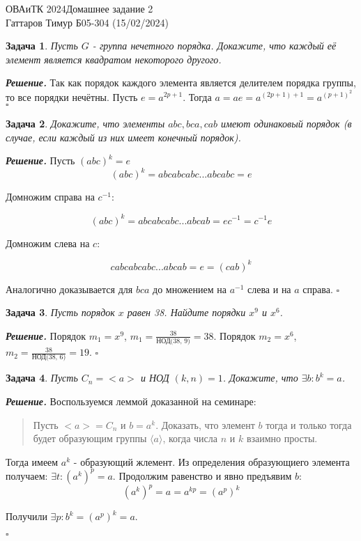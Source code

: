\documentclass[12pt]{article}
\newtheorem{problem}{Задача}
\newenvironment{solution}[1][\it{Решение}]{\textbf{#1. } }{$\square$}
\begin{document}
\noindent ОВАиТК 2024\hfill Домашнее задание 2 \\
Гаттаров Тимур Б05-304 (15/02/2024)

\hrulefill


\begin{problem}
Пусть $G$ - группа нечетного порядка. Докажите, что каждый её элемент является квадратом некоторого другого.
\end{problem}

\begin{solution}
Так как порядок каждого элемента является делителем порядка группы, то все порядки нечётны. Пусть $e = a^{2p + 1}$. Тогда $a = ae = a^{(2p + 1) + 1} = a^{(p + 1)^2}$
\end{solution} 


\begin{problem}
Докажите, что элементы $a b c, b c a, c a b$ имеют одинаковый порядок (в случае, если каждый из них имеет конечный порядок).
\end{problem}

\begin{solution}
Пусть $(abc)^k = e$
$$
(abc)^k = abcabcabc...abcabc = e
$$


Домножим справа на $c^{-1}$:


$$
(abc)^k = abcabcabc...abcab = ec^{-1} = c^{-1}e
$$



Домножим слева на $c$:

$$
cabcabcabc...abcab = e = (cab)^k
$$

Аналогично доказывается для $bca$ до множением на $a^{-1}$ слева и на $a$ справа.
\end{solution}


\begin{problem}
 Пусть порядок $x$ равен 38. Найдите порядки $x^9$ и $x^6$.
\end{problem}

 \begin{solution} Порядок $m_1 = x^9$, $m_1 = \frac{38}{\text{НОД(38, 9)}} = 38$. Порядок $m_2 = x^6$, $m_2 = \frac{38}{\text{НОД(38, 6)}} = 19$.
 \end{solution}


\begin{problem}
    Пусть $C_n=<a>$ и НОД $(k, n) = 1$. Докажите, что $\exists b: b^k=a$.
\end{problem}

\begin{solution}
    Воспользуемся леммой доказанной на семинаре:
\begin{quotation}
Пусть $<a>=C_n$ и $b=a^k$. Доказать, что элемент $b$ тогда и только тогда будет образующим группы $\langle a\rangle$, когда числа $n$ и $k$ взаимно просты.
\end{quotation}


Тогда имеем $a^k$ - образующий жлемент. Из определения образующиего элемента получаем: $\exists t : (a^k)^p = a$. Продолжим равенство и явно предъявим $b$:
$$
(a^k)^p = a = a^{kp} = (a^p)^k
$$

Получили $\exists p: b^k = (a^p)^k = a$.

\end{solution}
\end{document}
